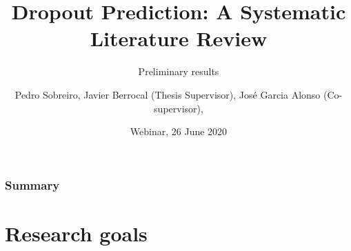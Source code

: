 \documentclass[10pt]{beamer}
\title[Dropout Prediction]{Dropout Prediction: A Systematic Literature Review}
\subtitle{Preliminary results}
\author[Sobreiro, Berrocal, Alonso]{Pedro Sobreiro, Javier Berrocal (Thesis Supervisor), José Garcia Alonso (Co-supervisor), } %
\institute[UNEX] %
{ 
University of Extremadura ~~~~~~~~~~~~~~~%
\medskip
\textit{pdealexa@alumnos.unex.es} %
}
\date{Webinar, 26 June 2020} %
\begin{document}
\begin{frame}
	\titlepage %
\end{frame}

\begin{frame}
\frametitle{Summary} %
\tableofcontents %

\end{frame}


\section{Research goals} %

\end{document}
